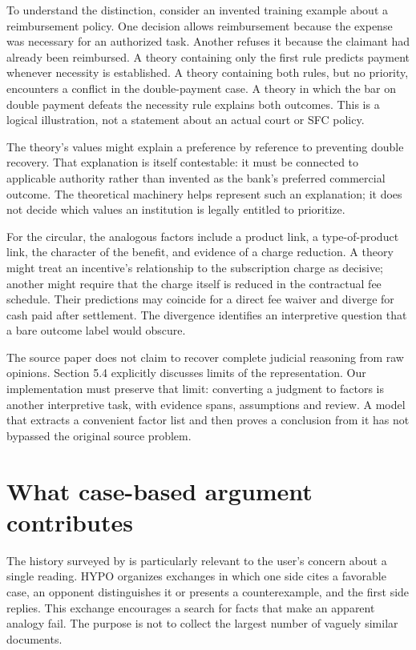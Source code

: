 \documentclass[12pt,a4paper,oneside,openany]{book}
\begin{document}
To understand the distinction, consider an invented training example about a
reimbursement policy. One decision allows reimbursement because the expense was
necessary for an authorized task. Another refuses it because the claimant had
already been reimbursed. A theory containing only the first rule predicts payment
whenever necessity is established. A theory containing both rules, but no
priority, encounters a conflict in the double-payment case. A theory in which the
bar on double payment defeats the necessity rule explains both outcomes. This is
a logical illustration, not a statement about an actual court or SFC policy.

The theory's values might explain a preference by reference to preventing double
recovery. That explanation is itself contestable: it must be connected to
applicable authority rather than invented as the bank's preferred commercial
outcome. The theoretical machinery helps represent such an explanation; it does
not decide which values an institution is legally entitled to prioritize.

For the circular, the analogous factors include a product link, a type-of-product
link, the character of the benefit, and evidence of a charge reduction. A theory
might treat an incentive's relationship to the subscription charge as decisive;
another might require that the charge itself is reduced in the contractual fee
schedule. Their predictions may coincide for a direct fee waiver and diverge for
cash paid after settlement. The divergence identifies an interpretive question
that a bare outcome label would obscure.

The source paper does not claim to recover complete judicial reasoning from raw
opinions. Section 5.4 explicitly discusses limits of the representation. Our
implementation must preserve that limit: converting a judgment to factors is
another interpretive task, with evidence spans, assumptions and review. A model
that extracts a convenient factor list and then proves a conclusion from it has
not bypassed the original source problem.

\section{What case-based argument contributes}
\label{merge:M05:02}


The history surveyed by \citet[sections 2--3]{hypolegacy2017} is particularly
relevant to the user's concern about a single reading. HYPO organizes exchanges
in which one side cites a favorable case, an opponent distinguishes it or presents
a counterexample, and the first side replies. This exchange encourages a search
for facts that make an apparent analogy fail. The purpose is not to collect the
largest number of vaguely similar documents.
\end{document}
